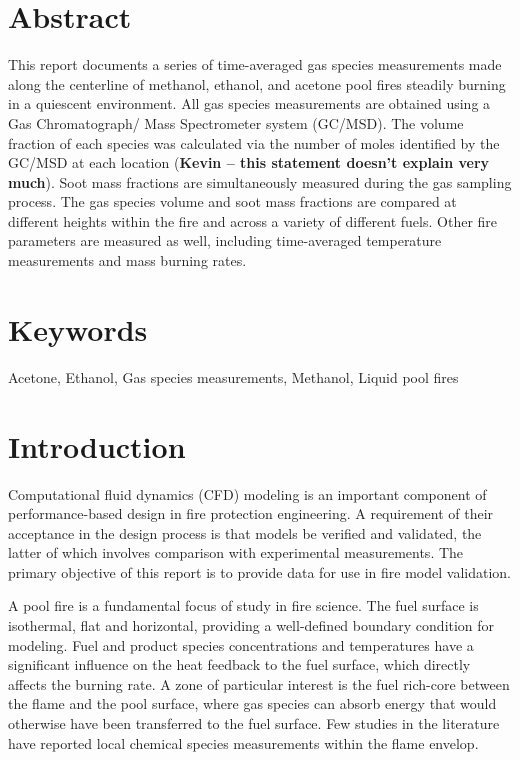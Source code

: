\documentclass[12pt]{article}
\begin{document}
\section*{Abstract}
This report documents a series of time-averaged gas species measurements made along the centerline of methanol, ethanol, and acetone pool fires steadily burning in a quiescent environment. All gas species measurements are obtained using a Gas Chromatograph/ Mass Spectrometer system (GC/MSD). The volume fraction of each species was calculated via the number of moles identified by the GC/MSD at each location ({\bf Kevin -- this statement doesn't explain very much}). Soot mass fractions are simultaneously measured during the gas sampling process. The gas species volume and soot mass fractions are compared at different heights within the fire and across a variety of different fuels. Other fire parameters are measured as well, including time-averaged temperature measurements and mass burning rates.
\section*{Keywords}
\normalsize Acetone, Ethanol, Gas species measurements, Methanol, Liquid pool fires \\
\pagebreak
\begin{center}
	\tableofcontents
	\listoftables
	\listoffigures
\end{center}
\pagebreak
\section{Introduction}
\label{sec:intro}
Computational fluid dynamics (CFD) modeling is an important component of performance-based design in fire protection engineering. A requirement of their acceptance in the design process is that models be verified and validated, the latter of which involves comparison with experimental measurements. The primary objective of this report is to provide data for use in fire model validation.

A pool fire is a fundamental focus of study in fire science. The fuel surface is isothermal, flat and horizontal, providing a well-defined boundary condition for modeling. Fuel and product species concentrations and temperatures have a significant influence on the heat feedback to the fuel surface, which directly affects the burning rate. A zone of particular interest is the fuel rich-core between the flame and the pool surface, where gas species can absorb energy that would otherwise have been transferred to the fuel surface. Few studies in the literature have reported local chemical species measurements within the flame envelop.
\end{document}
